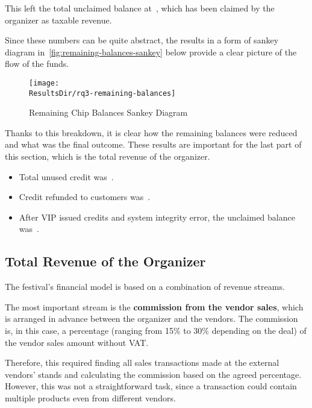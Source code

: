 This left the total unclaimed balance at~, which has been claimed by the organizer as taxable revenue.

Since these numbers can be quite abstract, the results in a form of sankey diagram in~\autoref{fig:remaining-balances-sankey} below provide a clear picture of the flow of the funds.

\begin{figure}[H]
	\centering
	\texttt{[image: \\ResultsDir/rq3-remaining-balances]}
	\caption{Remaining Chip Balances Sankey Diagram}
	\label{fig:remaining-balances-sankey}
	\source
\end{figure}

Thanks to this breakdown, it is clear how the remaining balances were reduced and what was the final outcome.
These results are important for the last part of this section, which is the total revenue of the organizer.

\begin{keytakeaways}
	\begin{itemize}
		\item Total unused credit was~.
		\item Credit refunded to customers was~.
		\item After VIP issued credits and system integrity error, the unclaimed balance was~.
	\end{itemize}
\end{keytakeaways}


\subsection{Total Revenue of the Organizer}
\label{subsec:analysis-total-revenue}

The festival's financial model is based on a combination of revenue streams.

The most important stream is the \textbf{commission from the vendor sales}, which is arranged in advance between the organizer and the vendors.
The commission is, in this case, a percentage (ranging from 15\% to 30\% depending on the deal) of the vendor sales amount without VAT\@.

Therefore, this required finding all sales transactions made at the external vendors' stands and calculating the commission based on the agreed percentage.
However, this was not a straightforward task, since a transaction could contain multiple products even from different vendors.

